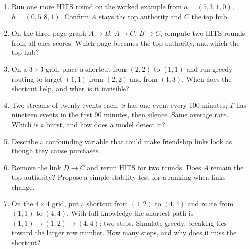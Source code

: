 \begin{enumerate}[label=\textbf{E\arabic*.}]
\item Run one more HITS round on the worked example from $a=(5,3,1,0)$, $h=(0,5,8,1)$. Confirm $A$ stays the top authority and $C$ the top hub.
\item On the three-page graph $A\to B$, $A\to C$, $B\to C$, compute two HITS rounds from all-ones scores. Which page becomes the top authority, and which the top hub?
\item On a $3\times3$ grid, place a shortcut from $(2,2)$ to $(1,1)$ and run greedy routing to target $(1,1)$ from $(2,2)$ and from $(1,3)$. When does the shortcut help, and when is it invisible?
\item Two streams of twenty events each: $S$ has one event every 100 minutes; $T$ has nineteen events in the first 90 minutes, then silence. Same average rate. Which is a burst, and how does a model detect it?
\item Describe a confounding variable that could make friendship links look as though they cause purchases.
\item Remove the link $D\to C$ and rerun HITS for two rounds. Does $A$ remain the top authority? Propose a simple stability test for a ranking when links change.
\item On the $4\times4$ grid, put a shortcut from $(1,2)$ to $(4,4)$ and route from $(1,1)$ to $(4,4)$. With full knowledge the shortest path is $(1,1)\to(1,2)\to(4,4)$: two steps. Simulate greedy, breaking ties toward the larger row number. How many steps, and why does it miss the shortcut?
\end{enumerate}

\clearpage
